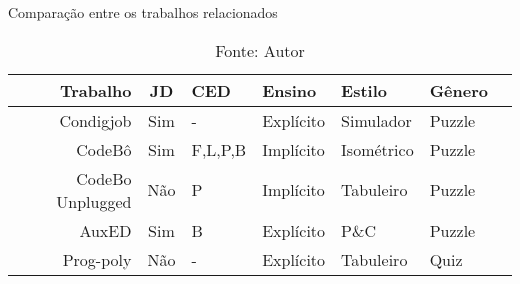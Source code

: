\begin{table}[H]
	\caption{Comparação entre os trabalhos relacionados}
	\label{tab:cmp_trabalhos_relatos}
	\centering
	\footnotesize
	\begin{tabular}{r|clllll}
		\toprule
		\textbf{Trabalho}      & \textbf{JD}  & \textbf{CED} & \textbf{Ensino}    & \textbf{Estilo}      & \textbf{Gênero}   \\
		\midrule
		Condigjob              & Sim          & -            & Explícito          & Simulador            & Puzzle            \\
		CodeBô                 & Sim          & F,L,P,B      & Implícito          & Isométrico           & Puzzle            \\
		CodeBo Unplugged       & Não          & P            & Implícito          & Tabuleiro            & Puzzle            \\
		AuxED                  & Sim          & B            & Explícito          & P\&C                 & Puzzle            \\
		Prog-poly              & Não          & -            & Explícito          & Tabuleiro            & Quiz              \\
		\bottomrule
	\end{tabular}
	\caption*{Fonte: Autor}
\end{table}
